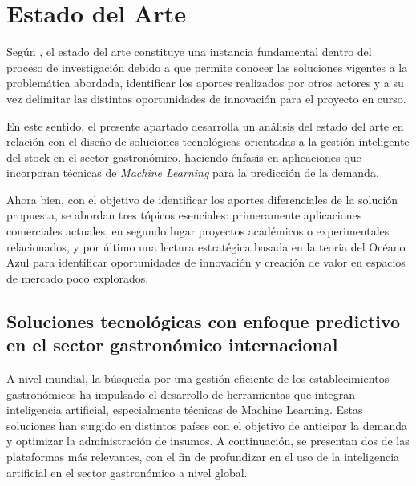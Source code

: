 \chapter{Estado del Arte}\label{chapter03}

Según \parencite{creswell2014}, el estado del arte constituye una instancia fundamental dentro del proceso de investigación debido a que permite conocer las soluciones vigentes a la problemática abordada, identificar los aportes realizados por otros actores y a su vez delimitar las distintas oportunidades de innovación para el proyecto en curso.

En este sentido, el presente apartado desarrolla un análisis del estado del arte en relación con el diseño de soluciones tecnológicas orientadas a la gestión inteligente del stock en el sector gastronómico, haciendo énfasis en aplicaciones que incorporan técnicas de \emph{Machine Learning} para la predicción de la demanda.

Ahora bien, con el objetivo de identificar los aportes diferenciales de la solución propuesta, se abordan tres tópicos esenciales: primeramente aplicaciones comerciales actuales, en segundo lugar proyectos académicos o experimentales relacionados, y por último una lectura estratégica basada en la teoría del Océano Azul para identificar oportunidades de innovación y creación de valor en espacios de mercado poco explorados.

\section{Soluciones tecnológicas con enfoque predictivo en el sector gastronómico internacional}\label{sec:estado-internacional}

A nivel mundial, la búsqueda por una gestión eficiente de los establecimientos gastronómicos ha impulsado el desarrollo de herramientas que integran inteligencia artificial, especialmente técnicas de Machine Learning. Estas soluciones han surgido en distintos países con el objetivo de anticipar la demanda y optimizar la administración de insumos. A continuación, se presentan dos de las plataformas más relevantes, con el fin de profundizar en el uso de la inteligencia artificial en el sector gastronómico a nivel global.

